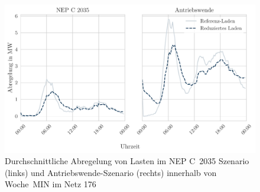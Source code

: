 \begin{figure}[H]
    \centering
    \includegraphics[width=\textwidth]{Bilder/176_load_curtailment_per_strategy}
    \caption{Durchschnittliche Abregelung von Lasten im NEP C~\num{2035} Szenario (links) und Antriebswende-Szenario (rechts) innerhalb von Woche~MIN im Netz \num{176}}\label{fig:176_load_curtailment_per_strategy}
\end{figure}